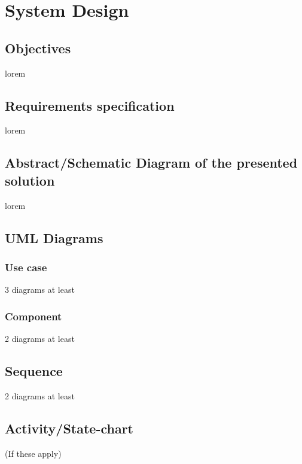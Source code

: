 \section{System Design}

\subsection{Objectives}
\par lorem

\subsection{Requirements specification}
\par lorem

\subsection{Abstract/Schematic Diagram of the presented solution}
\par lorem

\subsection{UML Diagrams}
\subsubsection{Use case}
\par 3 diagrams at least
\subsubsection{Component}
\par 2 diagrams at least
\subsection{Sequence}
\par 2 diagrams at least
\subsection{Activity/State-chart}
\par (If these apply)


\clearpage